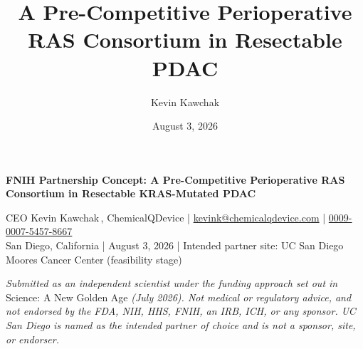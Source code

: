 \documentclass[11pt]{article}
\title{A Pre-Competitive Perioperative RAS Consortium in Resectable PDAC}
\author{Kevin Kawchak}
\date{August 3, 2026}
\begin{document}
\thispagestyle{plain}

{\raggedright\large\bfseries\color{protoblue} FNIH Partnership Concept:
A Pre-Competitive Perioperative RAS Consortium in Resectable KRAS-Mutated
PDAC\par}

\vspace{0.15em}


\vspace{-0.2em}
\apprule{0.8pt}

\noindent\small CEO Kevin Kawchak\,,
ChemicalQDevice \;|\;
\href{mailto:kevink@chemicalqdevice.com}{kevink@chemicalqdevice.com} \;|\;
\href{https://orcid.org/0009-0007-5457-8667}{0009-0007-5457-8667}\\
San Diego, California \;|\; August 3, 2026 \;|\; Intended partner site: UC San
Diego Moores Cancer Center (feasibility stage)\normalsize\par

\vspace{0.05em}

\noindent\footnotesize\textit{Submitted as an independent scientist under the
funding approach set out in} Science: A New Golden Age \textit{(July 2026). Not
medical or regulatory advice, and not endorsed by the FDA, NIH, HHS, FNIH, an
IRB, ICH, or any sponsor. UC San Diego is named as the intended partner of
choice and is not a sponsor, site, or endorser.}\normalsize\par

\vspace{-0.1em}
\apprule{0.4pt}







\end{document}
